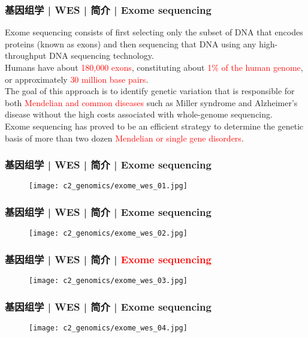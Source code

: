 \begin{frame}
  \frametitle{基因组学 | WES | 简介 | Exome sequencing}
  Exome sequencing consists of first selecting only the subset of DNA that encodes proteins (known as exons) and then sequencing that DNA using any high-throughput DNA sequencing technology.\\
  \vspace{1em}
  Humans have about \textcolor{red}{180,000 exons}, constituting about \textcolor{red}{1\% of the human genome}, or approximately \textcolor{red}{30 million base pairs}.\\
  \vspace{1em}
  The goal of this approach is to identify genetic variation that is responsible for both \textcolor{red}{Mendelian and common diseases} such as Miller syndrome and Alzheimer's disease without the high costs associated with whole-genome sequencing.\\
  \vspace{1em}
  Exome sequencing has proved to be an efficient strategy to determine the genetic basis of more than two dozen \textcolor{red}{Mendelian or single gene disorders}.
\end{frame}

\begin{frame}
  \frametitle{基因组学 | WES | 简介 | Exome sequencing}
  \begin{figure}
    \centering
    \texttt{[image: c2\_genomics/exome\_wes\_01.jpg]}
  \end{figure}
\end{frame}

\begin{frame}
  \frametitle{基因组学 | WES | 简介 | Exome sequencing}
  \begin{figure}
    \centering
    \texttt{[image: c2\_genomics/exome\_wes\_02.jpg]}
  \end{figure}
\end{frame}

\begin{frame}
  \frametitle{基因组学 | WES | 简介 | \textcolor{red}{Exome sequencing}}
  \begin{figure}
    \centering
    \texttt{[image: c2\_genomics/exome\_wes\_03.jpg]}
  \end{figure}
\end{frame}

\begin{frame}
  \frametitle{基因组学 | WES | 简介 | Exome sequencing}
  \begin{figure}
    \centering
    \texttt{[image: c2\_genomics/exome\_wes\_04.jpg]}
  \end{figure}
\end{frame}

